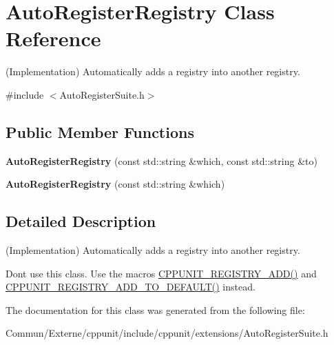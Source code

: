 \hypertarget{class_auto_register_registry}{}\section{Auto\+Register\+Registry Class Reference}
\label{class_auto_register_registry}


(Implementation) Automatically adds a registry into another registry.  




{\ttfamily \#include $<$Auto\+Register\+Suite.\+h$>$}

\subsection*{Public Member Functions}
\begin{DoxyCompactItemize}
\item 
{\bfseries Auto\+Register\+Registry} (const std\+::string \&which, const std\+::string \&to)\hypertarget{class_auto_register_registry_aeb3c0171549420bc18714d4117d9c2b5}{}\label{class_auto_register_registry_aeb3c0171549420bc18714d4117d9c2b5}

\item 
{\bfseries Auto\+Register\+Registry} (const std\+::string \&which)\hypertarget{class_auto_register_registry_a3efb50c6218f5d0e5969eb6fc8bccb23}{}\label{class_auto_register_registry_a3efb50c6218f5d0e5969eb6fc8bccb23}

\end{DoxyCompactItemize}


\subsection{Detailed Description}
(Implementation) Automatically adds a registry into another registry. 

Don\textquotesingle{}t use this class. Use the macros \hyperlink{_helper_macros_8h_a0ca9e37aca06e802300f2572b974e2bb}{C\+P\+P\+U\+N\+I\+T\+\_\+\+R\+E\+G\+I\+S\+T\+R\+Y\+\_\+\+A\+D\+D()} and \hyperlink{_helper_macros_8h_a1dde8c3db38012da58e1e456b7e4e346}{C\+P\+P\+U\+N\+I\+T\+\_\+\+R\+E\+G\+I\+S\+T\+R\+Y\+\_\+\+A\+D\+D\+\_\+\+T\+O\+\_\+\+D\+E\+F\+A\+U\+L\+T()} instead. 

The documentation for this class was generated from the following file\+:\begin{DoxyCompactItemize}
\item 
Commun/\+Externe/cppunit/include/cppunit/extensions/Auto\+Register\+Suite.\+h\end{DoxyCompactItemize}
